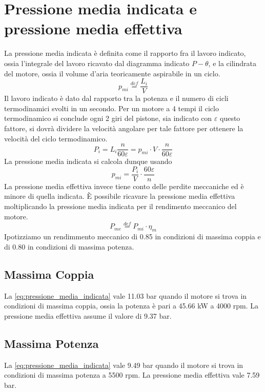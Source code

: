 \documentclass[a4paper,12pt]{article}
\begin{document}
\section{Pressione media indicata e pressione media effettiva}
La pressione media indicata è definita come il rapporto fra il lavoro indicato, ossia l'integrale del lavoro ricavato dal diagramma indicato $P-\theta$, e la cilindrata
del motore, ossia il volume d'aria teoricamente aspirabile in un ciclo.
\begin{equation}
    p_{mi} \stackrel{def}{=} \frac{L_i}{V}
\end{equation}
Il lavoro indicato è dato dal rapporto tra la potenza e il numero di cicli termodinamici svolti in un secondo. Per un motore a 4 tempi il ciclo termodinamico si conclude 
ogni 2 giri del pistone, sia indicato con $\varepsilon$ questo fattore, si dovrà dividere la velocità angolare per tale fattore per ottenere la velocità del ciclo termodinamico.
\begin{equation}
    P_i = L_i \frac{n}{60\varepsilon} = p_{mi} \cdot V \cdot \frac{n}{60\varepsilon}
\end{equation}
La pressione media indicata si calcola dunque usando
\begin{equation}
    \label{eq:pressione_media_indicata}
    p_{mi} = \frac{P_i}{V} \cdot  \frac{60\varepsilon}{n}
\end{equation}
La pressione media effettiva invece tiene conto delle perdite meccaniche ed è minore di quella indicata. È possibile ricavare la pressione media effettiva
moltiplicando la pressione media indicata per il rendimento meccanico del motore.
\begin{equation}
    P_{me} \stackrel{def}{=} P_{mi}\cdot \eta_m
\end{equation}
Ipotizziamo un rendimmento meccanico di 0.85 in condizioni di massima coppia e di 0.80 in condizioni di massima potenza.
\subsection{Massima Coppia}
La \eqref{eq:pressione_media_indicata} vale 11.03 bar quando il motore si trova in condizioni di massima coppia, ossia la potenza è pari a 45.66 kW a 4000 rpm.
La pressione media effettiva assume il valore di 9.37 bar.
\subsection{Massima Potenza}
La \eqref{eq:pressione_media_indicata} vale 9.49 bar quando il motore si trova in condizioni di massima potenza a 5500 rpm.
La pressione media effettiva vale 7.59 bar.
\end{document}
